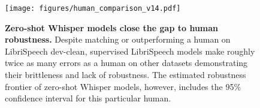 \documentclass[nohyperref]{article}
\theoremstyle{plain}
\theoremstyle{definition}
\theoremstyle{remark}
\begin{document}

\begin{figure}[t]
\begin{center}
\centerline{\texttt{[image: figures/human\_comparison\_v14.pdf]}}
\caption{\textbf{Zero-shot Whisper models close the gap to human robustness.} Despite matching or outperforming a human on LibriSpeech dev-clean, supervised LibriSpeech models make roughly twice as many errors as a human on other datasets demonstrating their brittleness and lack of robustness. The estimated robustness frontier of zero-shot Whisper models, however, includes the 95\% confidence interval for this particular human.}
\label{robustness_figure}
\end{center}
\vspace{-1em}
\end{figure}
\end{document}
